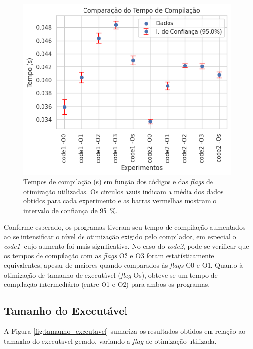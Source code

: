 \documentclass[12pt,a4paper]{article}
\begin{document}
\begin{figure}[H]
\centering
\includegraphics[width=0.80\linewidth]{Figures/comparacao_compilacao_codigo_intervalo.png}
\caption{Tempos de compilação (\si{\second}) em função dos códigos e das \textit{flags} de otimização utilizadas. Os círculos azuis indicam a média dos dados obtidos para cada experimento e as barras vermelhas mostram o intervalo de confiança de \SI{95}{\percent}.}
\label{fig:tempo_compilacao}
\end{figure}

Conforme esperado, os programas tiveram seu tempo de compilação aumentados ao se intensificar o nível de otimização exigido pelo compilador, em especial o \textit{code1}, cujo aumento foi mais significativo. No caso do \textit{code2}, pode-se verificar que os tempos de compilação com as \textit{flags} O2 e O3 foram estatísticamente equivalentes, apesar de maiores quando comparados às \textit{flags} O0 e O1. Quanto à otimização de tamanho de executável (\textit{flag} Os), obteve-se um tempo de compilação intermediário (entre O1 e O2) para ambos os programas. 

\subsection{Tamanho do Executável} \label{sec:tamanho_executavel}

A Figura \ref{fig:tamanho_executavel} sumariza os resultados obtidos em relação ao tamanho do executável gerado, variando a \textit{flag} de otimização utilizada.
\end{document}
